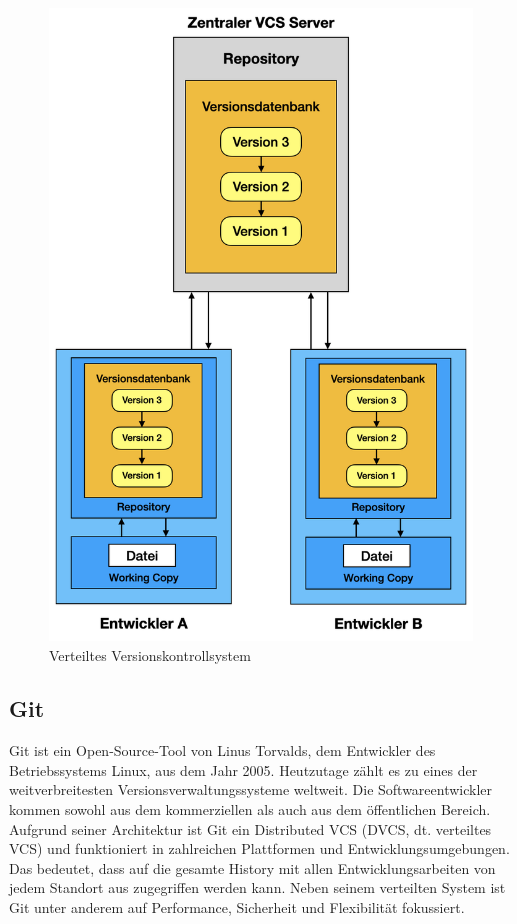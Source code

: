 \begin{itemize}
	\begin{figure}[H]
	\begin{center}
		\includegraphics[scale=.6]{images/distributed_vcs.png}
	\end{center}
		\caption{Verteiltes Versionskontrollsystem}
	\end{figure}
\end{itemize}

\subsection{Git}
Git \cite{git_2020} ist ein Open-Source-Tool von Linus Torvalds, dem Entwickler des Betriebssystems Linux, aus dem Jahr 2005. Heutzutage zählt es zu eines der weitverbreitesten Versionsverwaltungssysteme weltweit. Die Softwareentwickler kommen sowohl aus dem kommerziellen als auch aus dem öffentlichen Bereich. Aufgrund seiner Architektur ist Git ein Distributed VCS (DVCS, dt. verteiltes VCS) und funktioniert in zahlreichen Plattformen und Entwicklungsumgebungen. Das bedeutet, dass auf die gesamte History mit allen Entwicklungsarbeiten von jedem Standort aus zugegriffen werden kann. Neben seinem verteilten System ist Git unter anderem auf Performance, Sicherheit und Flexibilität fokussiert.

